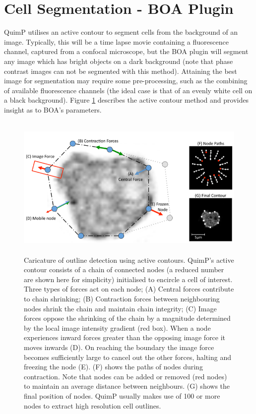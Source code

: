 \documentclass[a4paper,12pt]{article}
\begin{document}
\section{Cell Segmentation - BOA Plugin}

QuimP utilises an active contour to segment cells from the background of an image.  Typically, this will be a 
time lapse movie containing a fluorescence channel, captured from a confocal microscope, but the BOA plugin will 
segment any image which has bright objects on a dark background (note that phase contrast images can not be 
segmented with this method).  Attaining the best image for segmentation may require some pre-processing, such 
as the combining of available fluorescence channels (the ideal case is that of an evenly white cell on a black 
background).  Figure \ref{activeContour} describes the active contour method and provides insight as to BOA's 
parameters.\\

\begin{figure}[ht]
   \centering
   \includegraphics[height=7cm]{activeContour.png} %
   \caption{Caricature of outline detection using active
contours.
QuimP's active contour consists of a chain of connected
nodes (a reduced number are shown here for simplicity) initialised
to encircle a cell of interest. Three types of forces act on each
node; (A) Central forces contribute to chain shrinking; (B) Contraction
forces between neighbouring nodes shrink the chain and maintain chain
integrity; (C) Image forces oppose the shrinking of the chain by a
magnitude determined by the local image intensity gradient (red box).
When a node experiences inward forces greater than the opposing
image force it moves inwards (D). On reaching the boundary the image force becomes
sufficiently large to cancel out the other forces, halting and freezing
the node (E). (F) shows the paths of nodes during contraction. Note
that nodes can be added or removed (red nodes) to maintain an average
distance between neighbours. (G) shows the final position of nodes.
QuimP usually makes use of 100 or more nodes to extract high resolution
cell outlines. \cite{Tyson2010}}
   \label{activeContour}
\end{figure}
\end{document}
